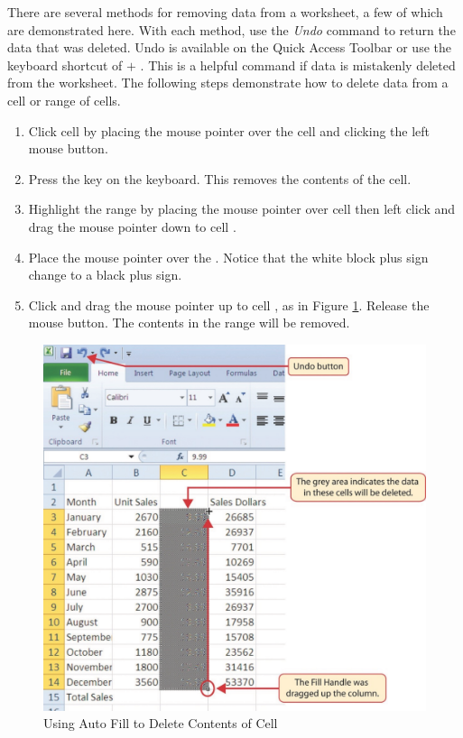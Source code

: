 There are several methods for removing data from a worksheet, a few of which are demonstrated here. With each method, use the \textit{Undo} command to return the data that was deleted. Undo is available on the Quick Access Toolbar or use the keyboard shortcut of  $ + $ . This is a helpful command if data is mistakenly deleted from the worksheet. The following steps demonstrate how to delete data from a cell or range of cells.

\begin{enumbox}
	\begin{enumerate}
		\item Click cell  by placing the mouse pointer over the cell and clicking the left mouse button.
		\item Press the  key on the keyboard. This removes the contents of the cell.
		\item Highlight the range  by placing the mouse pointer over cell  then left click and drag the mouse pointer down to cell .
		\item Place the mouse pointer over the . Notice that the white block plus sign change to a black plus sign.
		\item Click and drag the mouse pointer up to cell , as in Figure \ref{01:fig21}. Release the mouse button. The contents in the range  will be removed.
	\end{enumerate}
\end{enumbox}

\begin{figure}[H]
	\centering
	\includegraphics[width=\maxwidth{.95\linewidth}]{gfx/ch01_fig21}
	\caption{Using Auto Fill to Delete Contents of Cell}
	\label{01:fig21}
\end{figure}

